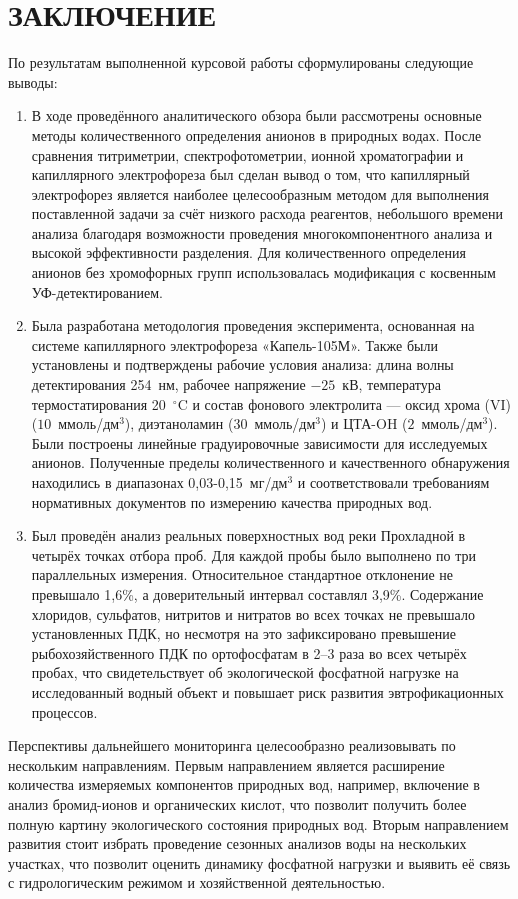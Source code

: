 \chapter*{ЗАКЛЮЧЕНИЕ}

По результатам выполненной курсовой работы сформулированы следующие выводы:

\begin{enumerate}
  \item В ходе проведённого аналитического обзора были рассмотрены основные методы количественного определения анионов в природных водах. После сравнения титриметрии, спектрофотометрии, ионной хроматографии и капиллярного электрофореза был сделан вывод о том, что капиллярный электрофорез является наиболее целесообразным методом для выполнения поставленной задачи за счёт низкого расхода реагентов, небольшого времени анализа благодаря возможности проведения многокомпонентного анализа и высокой эффективности разделения. Для количественного определения анионов без хромофорных групп использовалась модификация с косвенным УФ-детектированием.

  \item Была разработана методология проведения эксперимента, основанная на системе капиллярного электрофореза «Капель-105М». Также были установлены и подтверждены рабочие условия анализа: длина волны детектирования 254~нм, рабочее напряжение $-25$~кВ, температура термостатирования 20~$^\circ$C и состав фонового электролита — оксид хрома (VI) ($10$~ммоль/дм$^3$), диэтаноламин ($30$~ммоль/дм$^3$) и ЦТА-OH ($2$~ммоль/дм$^3$). Были построены линейные градуировочные зависимости для исследуемых анионов. Полученные пределы количественного и качественного обнаружения находились в диапазонах 0,03-0,15~мг/дм$^3$ и соответствовали требованиям нормативных документов по измерению качества природных вод.

  \item Был проведён анализ реальных поверхностных вод реки Прохладной в четырёх точках отбора проб. Для каждой пробы было выполнено по три параллельных измерения. Относительное стандартное отклонение не превышало 1,6\%, а доверительный интервал составлял 3,9\%. Содержание хлоридов, сульфатов, нитритов и нитратов во всех точках не превышало установленных ПДК, но несмотря на это зафиксировано превышение рыбохозяйственного ПДК по ортофосфатам в 2–3 раза во всех четырёх пробах, что свидетельствует об экологической фосфатной нагрузке на исследованный водный объект и повышает риск развития эвтрофикационных процессов.
\end{enumerate}

Перспективы дальнейшего мониторинга целесообразно реализовывать по нескольким направлениям. Первым направлением является расширение количества измеряемых компонентов природных вод, например, включение в анализ бромид-ионов и органических кислот, что позволит получить более полную картину экологического состояния природных вод. Вторым направлением развития стоит избрать проведение сезонных анализов воды на нескольких участках, что позволит оценить динамику фосфатной нагрузки и выявить её связь с гидрологическим режимом и хозяйственной деятельностью.
